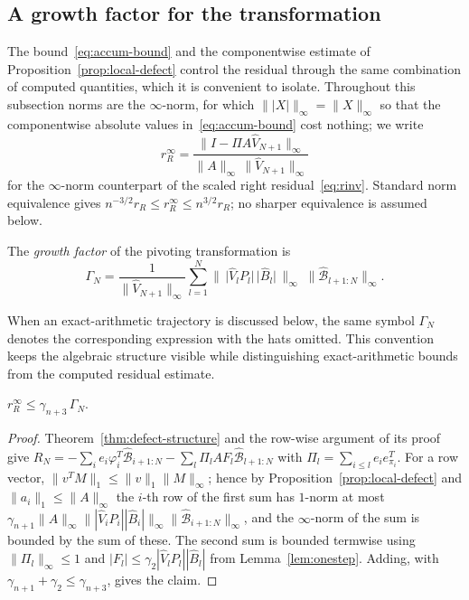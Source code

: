\documentclass[review,onefignum,onetabnum]{siamart251216}
\begin{document}
\subsection{A growth factor for the transformation}
\label{sec:growth}

The bound~\eqref{eq:accum-bound} and the componentwise estimate of
Proposition~\ref{prop:local-defect} control the residual through the same combination of computed
quantities, which it is convenient to isolate. Throughout this subsection norms are the
$\infty$-norm, for which $\||X|\|_\infty=\|X\|_\infty$ so that the componentwise absolute values
in~\eqref{eq:accum-bound} cost nothing; we write
%
\begin{equation}\label{eq:rinv-inf}
r_R^{\infty} = \frac{\bigl\|I-\Pi A\widehat V_{N+1}\bigr\|_\infty}
                    {\|A\|_\infty\,\|\widehat V_{N+1}\|_\infty}
\end{equation}
%
for the $\infty$-norm counterpart of the scaled right residual~\eqref{eq:rinv}. Standard
norm equivalence gives
$ n^{-3/2}r_R\le r_R^{\infty}\le n^{3/2}r_R$; no sharper equivalence is assumed below.

\begin{definition}\label{def:growth}
The \emph{growth factor} of the pivoting transformation is
%
\begin{equation}\label{eq:growth}
\Gamma_N
=
\frac{1}{\|\widehat V_{N+1}\|_\infty}
\sum_{l=1}^{N}
\bigl\|\,\bigl|\widehat V_lP_l\bigr|\,\bigl|\widehat B_l\bigr|\,\bigr\|_\infty
\;\bigl\|\widehat{\mathcal{B}}_{l+1:N}\bigr\|_\infty .
\end{equation}
\end{definition}

When an exact-arithmetic trajectory is discussed below, the same symbol $\Gamma_N$ denotes the
corresponding expression with the hats omitted. This convention keeps the algebraic structure
visible while distinguishing exact-arithmetic bounds from the computed residual estimate.

\begin{proposition}\label{prop:growth-bound}
$r_R^{\infty} \le \gamma_{n+3}\,\Gamma_N$.
\end{proposition}

\begin{proof}
Theorem~\ref{thm:defect-structure} and the row-wise argument of its proof give
$R_N = -\sum_{i} e_i\varphi_i^T\widehat{\mathcal{B}}_{i+1:N}
- \sum_{l} \Pi_l A F_l\widehat{\mathcal{B}}_{l+1:N}$ with $\Pi_l=\sum_{i\le l}e_ie_{\pi_i}^T$.
For a row vector, $\|v^TM\|_1\le\|v\|_1\|M\|_\infty$; hence by
Proposition~\ref{prop:local-defect} and $\|a_i\|_1\le\|A\|_\infty$ the $i$-th row of the first
sum has $1$-norm at most $\gamma_{n+1}\|A\|_\infty\||\widehat V_iP_i||\widehat B_i|\|_\infty
\|\widehat{\mathcal{B}}_{i+1:N}\|_\infty$, and the $\infty$-norm of the sum is bounded by the
sum of these. The second sum is bounded termwise using $\|\Pi_l\|_\infty\le1$ and
$|F_l|\le\gamma_2|\widehat V_lP_l||\widehat B_l|$ from Lemma~\ref{lem:onestep}. Adding, with
$\gamma_{n+1}+\gamma_2\le\gamma_{n+3}$, gives the claim.
\end{proof}
\end{document}
